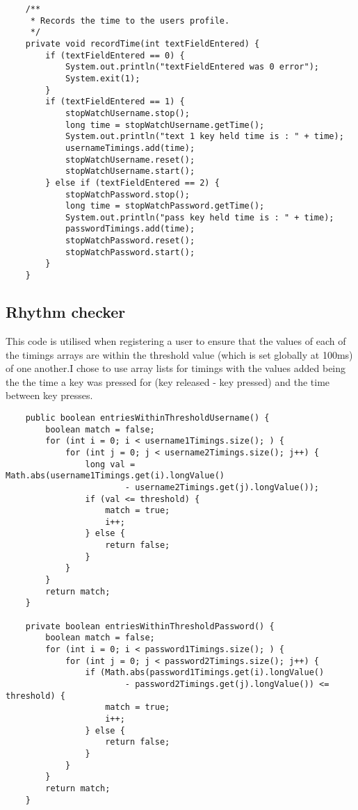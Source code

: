 \documentclass{article}
\begin{document}
\begin{lstlisting}
    /**
     * Records the time to the users profile.
     */
    private void recordTime(int textFieldEntered) {
        if (textFieldEntered == 0) {
            System.out.println("textFieldEntered was 0 error");
            System.exit(1);
        }
        if (textFieldEntered == 1) {
            stopWatchUsername.stop();
            long time = stopWatchUsername.getTime();
            System.out.println("text 1 key held time is : " + time);
            usernameTimings.add(time);
            stopWatchUsername.reset();
            stopWatchUsername.start();
        } else if (textFieldEntered == 2) {
            stopWatchPassword.stop();
            long time = stopWatchPassword.getTime();
            System.out.println("pass key held time is : " + time);
            passwordTimings.add(time);
            stopWatchPassword.reset();
            stopWatchPassword.start();
        }
    }
\end{lstlisting}

\subsection{Rhythm checker}
This code is utilised when registering a user to ensure that the values of each of the timings arrays are within the threshold value (which is set globally at 100ms) of one another.I chose to use array lists for timings with the values added being the the time a key was pressed for (key released - key pressed) and the time between key presses.
\begin{lstlisting}
    public boolean entriesWithinThresholdUsername() {
        boolean match = false;
        for (int i = 0; i < username1Timings.size(); ) {
            for (int j = 0; j < username2Timings.size(); j++) {
                long val = Math.abs(username1Timings.get(i).longValue()
                        - username2Timings.get(j).longValue());
                if (val <= threshold) {
                    match = true;
                    i++;
                } else {
                    return false;
                }
            }
        }
        return match;
    }

    private boolean entriesWithinThresholdPassword() {
        boolean match = false;
        for (int i = 0; i < password1Timings.size(); ) {
            for (int j = 0; j < password2Timings.size(); j++) {
                if (Math.abs(password1Timings.get(i).longValue()
                        - password2Timings.get(j).longValue()) <= threshold) {
                    match = true;
                    i++;
                } else {
                    return false;
                }
            }
        }
        return match;
    }
\end{lstlisting}
\end{document}
